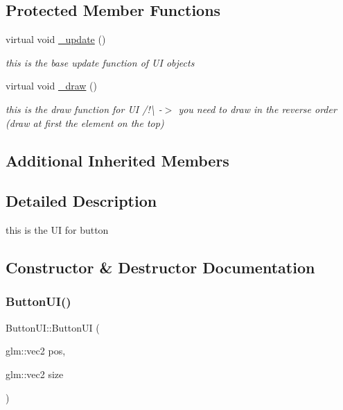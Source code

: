 \subsection*{Protected Member Functions}
\begin{DoxyCompactItemize}
\item 
\mbox{\label{class_button_u_i_a984a9fd2a19550a1a39a7ab905fe1f14}} 
virtual void \hyperlink{class_button_u_i_a984a9fd2a19550a1a39a7ab905fe1f14}{\+\_\+update} ()
\begin{DoxyCompactList}\small\item\em this is the base update function of UI objects \end{DoxyCompactList}\item 
\mbox{\label{class_button_u_i_aa183e89b7efbc8eed5fc91ce16029725}} 
virtual void \hyperlink{class_button_u_i_aa183e89b7efbc8eed5fc91ce16029725}{\+\_\+draw} ()
\begin{DoxyCompactList}\small\item\em this is the draw function for UI /!\textbackslash{} -\/$>$ you need to draw in the reverse order (draw at first the element on the top) \end{DoxyCompactList}\end{DoxyCompactItemize}
\subsection*{Additional Inherited Members}


\subsection{Detailed Description}
this is the UI for button 

\subsection{Constructor \& Destructor Documentation}
\mbox{\label{class_button_u_i_a06e5f10c62feee5baf35f88f3af574b2}} 
\subsubsection{\texorpdfstring{Button\+U\+I()}{ButtonUI()}\hspace{0.1cm}{\footnotesize\ttfamily [1/2]}}
{\footnotesize\ttfamily Button\+U\+I\+::\+Button\+UI (\begin{DoxyParamCaption}\item[{glm\+::vec2}]{pos,  }\item[{glm\+::vec2}]{size }\end{DoxyParamCaption})}



